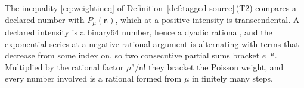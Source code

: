 
The inequality \eqref{eq:weightineq} of Definition~\ref{def:tagged-source}\,(T2)
compares a declared number with $P_\mu(\mathsf{n})$, which at a positive
intensity is transcendental. A declared intensity is a binary64 number, hence a
dyadic rational, and the exponential series at a negative rational argument is
alternating with terms that decrease from some index on, so two consecutive
partial sums bracket $e^{-\mu}$. Multiplied by the rational factor
$\mu^{\mathsf{n}}/\mathsf{n}!$ they bracket the Poisson weight, and every
number involved is a rational formed from $\mu$ in finitely many steps.

